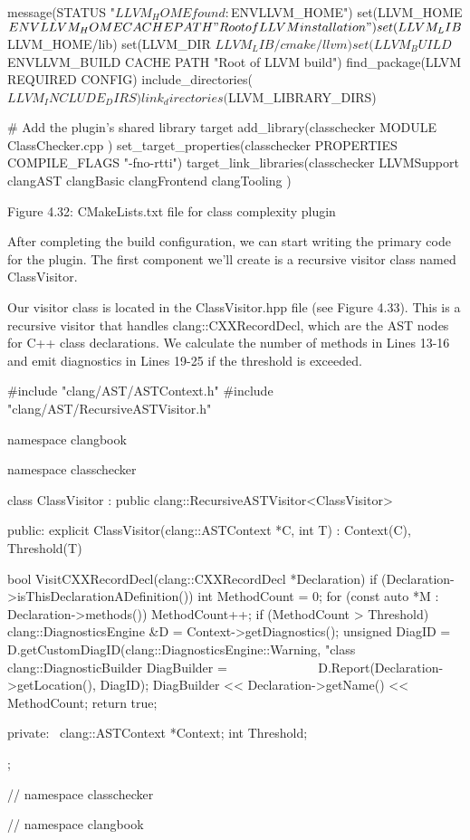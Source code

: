 \begin{cmake}
message(STATUS "$LLVM_HOME found: $ENV{LLVM_HOME}")
set(LLVM_HOME $ENV{LLVM_HOME} CACHE PATH "Root of LLVM installation")
set(LLVM_LIB ${LLVM_HOME}/lib)
set(LLVM_DIR ${LLVM_LIB}/cmake/llvm)
set(LLVM_BUILD $ENV{LLVM_BUILD} CACHE PATH "Root of LLVM build")
find_package(LLVM REQUIRED CONFIG)
include_directories(${LLVM_INCLUDE_DIRS})
link_directories(${LLVM_LIBRARY_DIRS})

# Add the plugin's shared library target
add_library(classchecker MODULE
  ClassChecker.cpp
)
set_target_properties(classchecker PROPERTIES COMPILE_FLAGS "-fno-rtti")
target_link_libraries(classchecker
  LLVMSupport
  clangAST
  clangBasic
  clangFrontend
  clangTooling
)
\end{cmake}

\begin{center}
Figure 4.32: CMakeLists.txt file for class complexity plugin
\end{center}

After completing the build configuration, we can start writing the primary code for the plugin. The first component we'll create is a recursive visitor class named ClassVisitor.


Our visitor class is located in the ClassVisitor.hpp file (see Figure 4.33). This is a recursive visitor that handles clang::CXXRecordDecl, which are the AST nodes for C++ class declarations. We calculate the number of methods in Lines 13-16 and emit diagnostics in Lines 19-25 if the threshold is exceeded.

\begin{cpp}
#include "clang/AST/ASTContext.h"
#include "clang/AST/RecursiveASTVisitor.h"

namespace clangbook {
namespace classchecker {
class ClassVisitor : public clang::RecursiveASTVisitor<ClassVisitor> {
public:
  explicit ClassVisitor(clang::ASTContext *C, int T)
    : Context(C), Threshold(T) {}

  bool VisitCXXRecordDecl(clang::CXXRecordDecl *Declaration) {
    if (Declaration->isThisDeclarationADefinition()) {
      int MethodCount = 0;
      for (const auto *M : Declaration->methods()) {
        MethodCount++;
      }
      if (MethodCount > Threshold) {
        clang::DiagnosticsEngine &D = Context->getDiagnostics();
        unsigned DiagID =
          D.getCustomDiagID(clang::DiagnosticsEngine::Warning,
                            "class %
        clang::DiagnosticBuilder DiagBuilder =
               D.Report(Declaration->getLocation(), DiagID);
        DiagBuilder << Declaration->getName() << MethodCount;
      }
    }
    return true;
  }

private:
  clang::ASTContext *Context;
  int Threshold;
};
} // namespace classchecker
} // namespace clangbook
\end{cpp}


